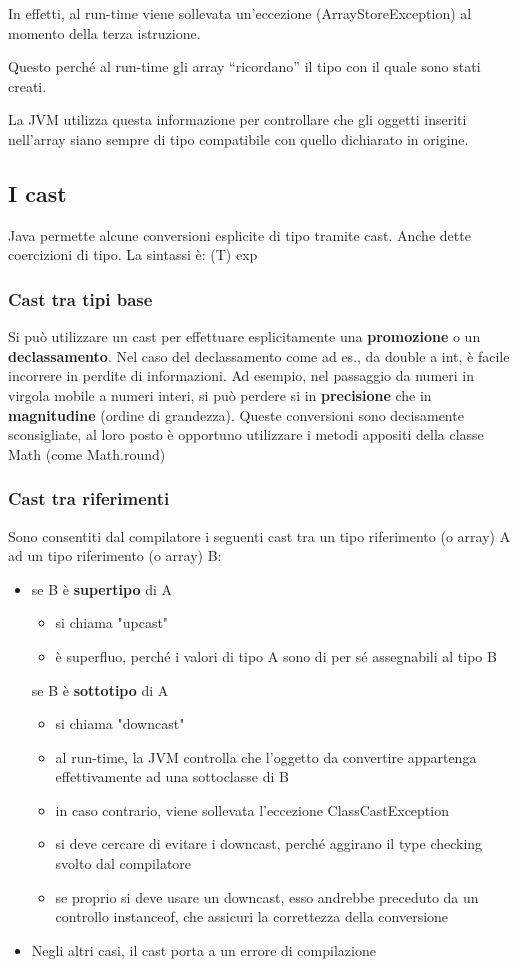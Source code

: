 \documentclass[10pt]{article}
\begin{document}
In effetti, al run-time viene sollevata un'eccezione (ArrayStoreException) al momento della 
terza istruzione.

Questo perché al run-time gli array “ricordano” il tipo con il quale sono stati creati.

La JVM utilizza questa informazione per controllare che gli oggetti inseriti nell'array siano 
sempre di tipo compatibile con quello dichiarato in origine.
\subsection{I cast}
Java permette alcune conversioni esplicite di tipo tramite cast.
Anche dette coercizioni di tipo.
La sintassi è: (T) exp
\subsubsection{Cast tra tipi base}
Si può utilizzare un cast per effettuare esplicitamente una \textbf{promozione} o un \textbf{declassamento}. Nel caso del declassamento come ad es., da double a int, è facile incorrere in perdite di informazioni. Ad esempio, nel passaggio da numeri in virgola mobile a numeri interi, si può perdere si in \textbf{precisione} che in \textbf{magnitudine} (ordine di grandezza).
Queste conversioni sono decisamente sconsigliate, al loro posto è opportuno utilizzare i metodi 
appositi della classe Math (come Math.round)
\subsubsection{Cast tra riferimenti}
Sono consentiti dal compilatore i seguenti cast tra un tipo riferimento (o array) A ad 
un tipo riferimento (o array) B:
\begin{itemize}
    \item se B è \textbf{supertipo} di A
    \begin{itemize}
        \item si chiama "upcast"
        \item è superfluo, perché i valori di tipo A sono di per sé assegnabili al tipo B
    \end{itemize}
    se B è \textbf{sottotipo} di A
    \begin{itemize}
        \item si chiama "downcast"
        \item al run-time, la JVM controlla che l'oggetto da convertire appartenga effettivamente ad una sottoclasse di B
        \item in caso contrario, viene sollevata l'eccezione ClassCastException
        \item si deve cercare di evitare i downcast, perché aggirano il type checking svolto dal compilatore
        \item se proprio si deve usare un downcast, esso andrebbe preceduto da un controllo instanceof, che assicuri la correttezza della conversione
    \end{itemize}
    \item  Negli altri casi, il cast porta a un errore di compilazione
\end{itemize}
\end{document}
